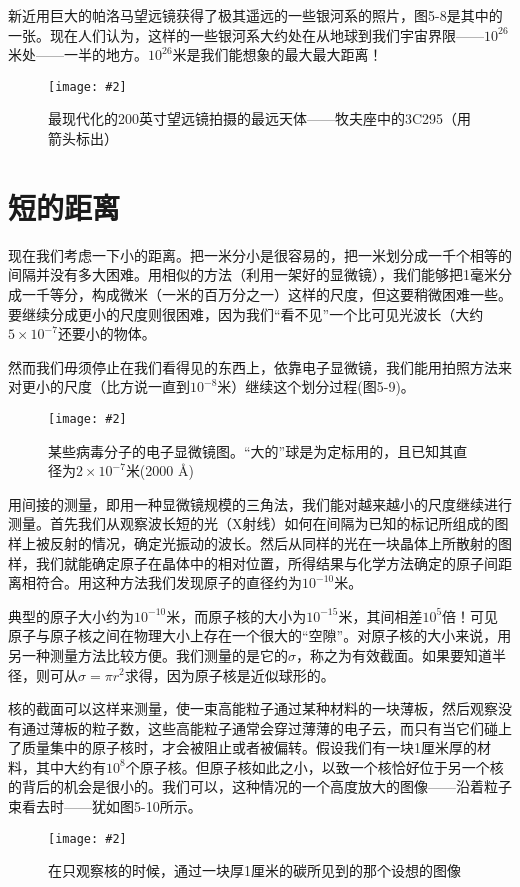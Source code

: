 \documentclass[12pt,oneside]{book}
\newenvironment{fig}[2][1]
{\begin{figure}[H]
\centering
\texttt{[image: \#2]}}
{\end{figure}}
\begin{document}
新近用巨大的帕洛马望远镜获得了极其遥远的一些银河系的照片，图5-8是其中的一张。现在人们认为，这样的一些银河系大约处在从地球到我们宇宙界限——$ 10^{26} $米处——一半的地方。$ 10^{26} $米是我们能想象的最大最大距离！
\begin{fig}[2.5]{牧夫座中的3c295}
\caption{\footnotesize 最现代化的200英寸望远镜拍摄的最远天体——牧夫座中的3C295（用箭头标出）}
\label{fig:牧夫座中的3c295}
\end{fig}


\section{短的距离}
现在我们考虑一下小的距离。把一米分小是很容易的，把一米划分成一千个相等的间隔并没有多大困难。用相似的方法（利用一架好的显微镜），我们能够把1毫米分成一千等分，构成微米（一米的百万分之一）这样的尺度，但这要稍微困难一些。要继续分成更小的尺度则很困难，因为我们“看不见”一个比可见光波长（大约$ 5\times 10^{-7} $还要小的物体。

然而我们毋须停止在我们看得见的东西上，依靠电子显微镜，我们能用拍照方法来对更小的尺度（比方说一直到$ 10^{-8} $米）继续这个划分过程(图5-9)。
\begin{fig}[2.5]{某些病毒分子的电子显微镜图}
\caption{\footnotesize 某些病毒分子的电子显微镜图。“大的”球是为定标用的，且已知其直径为$ 2\times 10^{-7} $米(2000 Å)}
\label{fig:某些病毒分子的电子显微镜图}
\end{fig}
用间接的测量，即用一种显微镜规模的三角法，我们能对越来越小的尺度继续进行测量。首先我们从观察波长短的光（X射线）如何在间隔为已知的标记所组成的图样上被反射的情况，确定光振动的波长。然后从同样的光在一块晶体上所散射的图样，我们就能确定原子在晶体中的相对位置，所得结果与化学方法确定的原子间距离相符合。用这种方法我们发现原子的直径约为$10^{-10}$米。

典型的原子大小约为$10^{-10}$米，而原子核的大小为$10^{-15}$米，其间相差$10^5$倍！可见原子与原子核之间在物理大小上存在一个很大的“空隙”。对原子核的大小来说，用另一种测量方法比较方便。我们测量的是它的$\sigma$，称之为有效截面。如果要知道半径，则可从$\sigma=\pi r^2$求得，因为原子核是近似球形的。

核的截面可以这样来测量，使一束高能粒子通过某种材料的一块薄板，然后观察没有通过薄板的粒子数，这些高能粒子通常会穿过薄薄的电子云，而只有当它们碰上了质量集中的原子核时，才会被阻止或者被偏转。假设我们有一块1厘米厚的材料，其中大约有$10^8$个原子核。但原子核如此之小，以致一个核恰好位于另一个核的背后的机会是很小的。我们可以，这种情况的一个高度放大的图像——沿着粒子束看去时——犹如图5-10所示。
\begin{fig}{一块厚1厘米的碳设想的图像}
\caption{\footnotesize 在只观察核的时候，通过一块厚1厘米的碳所见到的那个设想的图像}
\label{fig:一块厚1厘米的碳设想的图像}
\end{fig}
\end{document}
